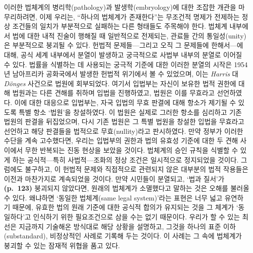 이러한 법체계의 병리학(pathology)과 발생학(embryology)에 대한 조잡한
개관을 마무리하려면, 이제 우리는, ``하나의 법체계가 존재한다''는
무조건적 명제가 전제하는 정상 조건들의 일치가 부분적으로 실패하는 다른
형태들도 주목해야 한다. 법체계 내부에서 법에 대한 내적 진술이 행해질 때
일반적으로 전제되는, 관료들 간의 통일성(unity)은 부분적으로 붕괴될 수
있다. 헌법적 문제들---그리고 오직 그 문제들에 한해서---에 대해, 공식
세계 내부에서 분열이 발생하고 궁극적으로 사법부 내부의 분열로 이어질 수
있다. 법률을 식별하는 데 사용되는 궁극적 기준에 대한 이러한 분열의
시작은 1954년 남아프리카 공화국에서 발생한 헌법적 위기에서 볼 수
있었으며, 이는 \emph{Harris} 대 \emph{Dönges} 사건으로 법원에
회부되었다. 여기서 입법부는 자신이 보유한 법적 권한에 대해 법원과는 다른
견해를 취하며 입법을 진행하였고, 법원은 이를 무효라고 선언하였다. 이에
대한 대응으로 입법부는, 자국 입법의 무효 판결에 대해 항소가 제기될 수
있도록 특별 항소 `법원'을 창설하였다. 이 법원은 실제로 그러한 항소를
심리하고 기존 법원의 판결을 뒤집었으며, 다시 기존 법원은 그 특별 법원을
창설한 입법을 무효라고 선언하고 해당 판결들을 법적으로 무효(nullity)라고
판시하였다. 만약 정부가 이러한 수단을 계속 고수했다면, 우리는 입법부의
권한과 법의 유효성 기준에 대한 두 견해 사이에서 무한 반복되는 진동
현상을 보았을 것이다. 법체계의 승인 규칙을 식별할 수 있게 하는
공식적---특히 사법적---조화의 정상 조건은 일시적으로 정지되었을 것이다.
그럼에도 불구하고, 이 헌법적 문제와 직접적으로 관련되지 않은 대부분의
법적 작용들은 이전과 마찬가지로 계속되었을 것이다. 만약 시민들이
분열되고, `법과 질서'가 \textbf{(p.~123)} 붕괴되지 않았다면, 원래의
법체계가 소멸했다고 말하는 것은 오해를 불러올 수 있다. 왜냐하면 `동일한
법체계(same legal system)'라는 표현은 너무 넓고 유연하기 때문에, 유효한
법의  원래 기준에 대한 공식적 합의가 유지되는 것을 그
체계가 `동일하다'고 인식하기 위한 필요조건으로 삼을 수는 없기 때문이다.
우리가 할 수 있는 최선은 지금까지 기술해온 방식대로 해당 상황을
설명하고, 그것을 하나의 표준 이하(substandard), 비정상적인 사례로 기록해
두는 것이다. 이 사례는 그 속에 법체계가 붕괴할 수 있는 잠재적 위협을
품고 있다.

